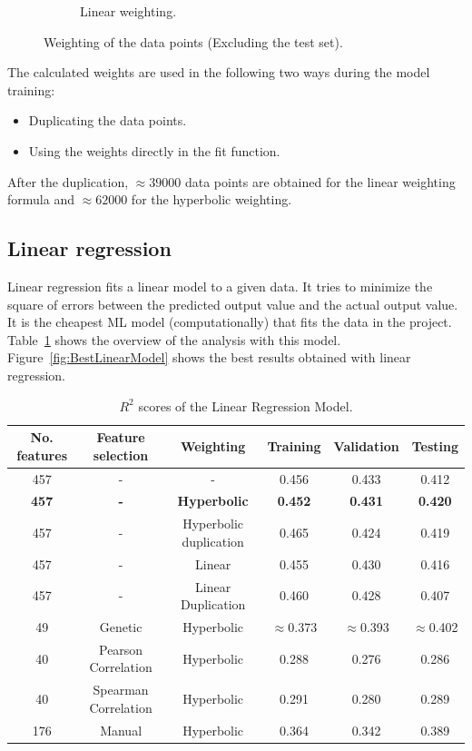 \documentclass[11pt]{article}
\begin{document}
\begin{figure}
\begin{subfigure}[b]{0.45\textwidth}
        \caption{Linear weighting.}
        \label{fig:linearweightdistribution}
     \end{subfigure}
     \caption{Weighting of the data points (Excluding the test set).}
     \label{fig:WeightDistribution}
\end{figure}

The calculated weights are used in the following two ways during the model training:

\begin{itemize}
\item Duplicating the data points.
\item Using the weights directly in the fit function.
\end{itemize}

After the duplication, $\approx 39000$ data points are obtained for the linear weighting formula and $\approx 62000$ for the hyperbolic weighting.

\subsection{Linear regression}
Linear regression fits a linear model to a given data.
It tries to minimize the square of errors between the predicted output value and the actual output value.
It is the cheapest ML model (computationally) that fits the data in the project.
Table~\ref{table:1} shows the overview of the analysis with this model.
Figure~\ref{fig:BestLinearModel} shows the best results obtained with linear regression.

\begin{table} [h!]
\centering
\resizebox{\linewidth}{!} {
\begin{tabular}{ | c | c | c | c | c | c | }
\hline
\textbf{No.  features} & \textbf{Feature selection} & \textbf{Weighting} & \textbf{Training} & \textbf{Validation} & \textbf{Testing} \\ [0.5 ex]
\hline \hline
457 & - & - & 0.456 & 0.433 & 0.412\\
\textbf{457} &  \textbf{-} & \textbf{Hyperbolic} & \textbf{0.452} & \textbf{0.431} & \textbf{0.420}\\
457 & - & Hyperbolic duplication & 0.465 & 0.424 & 0.419\\
457 & - & Linear & 0.455 & 0.430 & 0.416\\
457 & - & Linear Duplication & 0.460 & 0.428 & 0.407\\
49 & Genetic\footnotemark[1] & Hyperbolic & $\approx$0.373 & $\approx$0.393  & $\approx$0.402\\
40 & Pearson Correlation & Hyperbolic & 0.288 & 0.276  & 0.286 \\ 
40 & Spearman Correlation & Hyperbolic & 0.291 & 0.280  & 0.289 \\ 
176 & Manual & Hyperbolic & 0.364  & 0.342  & 0.389\\ [1ex]
\hline
\end{tabular}
}
\caption{$R^2$ scores of the Linear Regression Model.}
\label {table:1}
\end{table}
\end{document}
